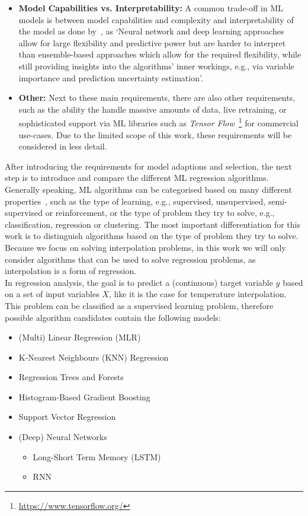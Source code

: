 \begin{itemize}
    \item \textbf{Model Capabilities vs. Interpretability:} A common trade-off in ML models is between model capabilities and complexity and interpretability of the model as done by~\cite{zumwald2021mapping}, as `Neural network and deep learning approaches allow for large flexibility and predictive power but are harder to interpret than ensemble-based approaches which allow for the required flexibility, while still providing insights into the algorithms' inner workings, e.g., via variable importance and prediction uncertainty estimation'.
    \item \textbf{Other:} Next to these main requirements, there are also other requirements, such as the ability the handle massive amounts of data, live retraining, or sophisticated support via ML libraries such as \textit{Tensor Flow}~\footnote{\url{https://www.tensorflow.org/}} for commercial use-cases. Due to the limited scope of this work, these requirements will be considered in less detail.
\end{itemize}

After introducing the requirements for model adaptions and selection, the next step is to introduce and compare the different ML regression algorithms.
Generally speaking, ML algorithms can be categorised based on many different properties~\cite{sarker2021machine}, such as the type of learning, e.g., supervised, unsupervised, semi-supervised or reinforcement, or the type of problem they try to solve, e.g., classification, regression or clustering. The most important differentiation for this work is to distinguish algorithms based on the type of problem they try to solve. Because we focus on solving interpolation problems, in this work we will only consider algorithms that can be used to solve regression problems, as interpolation is a form of regression.\\
In regression analysis, the goal is to predict a (continuous) target variable $y$ based on a set of input variables $X$, like it is the case for temperature interpolation. This problem can be classified as a supervised learning problem, therefore possible algorithm candidates contain the following models:

\begin{itemize}
    \item (Multi) Linear Regression (MLR)
    \item K-Nearest Neighbours (KNN) Regression
    \item Regression Trees and Forests
    \item Histogram-Based Gradient Boosting
    \item Support Vector Regression
    \item (Deep) Neural Networks

    \begin{itemize}
        \item Long-Short Term Memory (LSTM)
        \item RNN
    \end{itemize}
\end{itemize}


